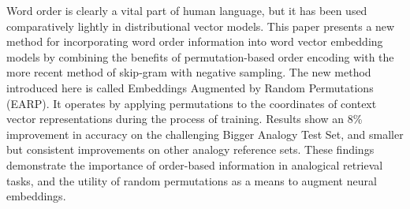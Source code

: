 Word order is clearly a vital part of human language, but it has been used comparatively lightly in distributional vector models. This paper presents a new method for incorporating word order information into word vector embedding models by combining the benefits of permutation-based order encoding with the more recent method of skip-gram with negative sampling. The new method introduced here is called Embeddings Augmented by Random Permutations (EARP). It operates by applying permutations to the coordinates of context vector representations during the process of training. Results show an 8\% improvement in accuracy on the challenging Bigger Analogy Test Set, and smaller but consistent improvements on other analogy reference sets. These findings demonstrate the importance of order-based information in analogical retrieval tasks, and the utility of random permutations as a means to augment neural embeddings.
